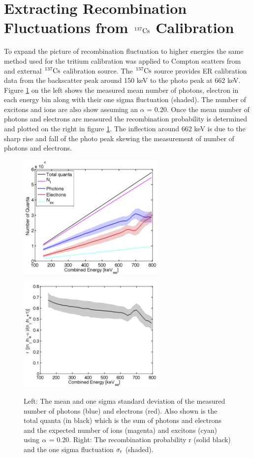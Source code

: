 \newpage

\section{Extracting Recombination Fluctuations from $\rm ^{137}Cs$ Calibration}

To expand the picture of recombination fluctuation to higher energies the same method used for the tritium calibration was applied to Compton scatters from and external $\rm ^{137}Cs$ calibration source. The $\rm ^{137}Cs$ source provides ER calibration data from the backscatter peak around 150 keV to the photo peak at 662 keV. Figure \ref{fig:Cs_LYQYR} on the left shows the measured mean number of photons, electron in each energy bin along with their one sigma fluctuation (shaded). The number of excitons and ions are also show assuming an $\alpha$ = 0.20. Once the mean number of photons and electrons are measured the recombination probability is determined and plotted on the right in figure \ref{fig:Cs_LYQYR}. The inflection around 662 keV is due to the sharp rise and fall of the photo peak skewing the measurement of number of photons and electrons.

\begin{figure}[h!]\centering
\includegraphics[width=72mm]{Chapter_Flucs/Figures/Cs/quanta_cs_.png}
\includegraphics[width=72mm]{Chapter_Flucs/Figures/Cs/R_cs_.png}
\caption{ Left: The mean and one sigma standard deviation of the measured number of photons (blue) and electrons (red). Also shown is the total quanta (in black) which is the sum of photons and electrons and the expected number of ions (magenta) and excitons (cyan) using $\rm \alpha$ = 0.20. Right: The recombination probability r (solid black) and the one sigma fluctuation $\rm \sigma_{r}$ (shaded). }
\label{fig:Cs_LYQYR}
\end{figure}

